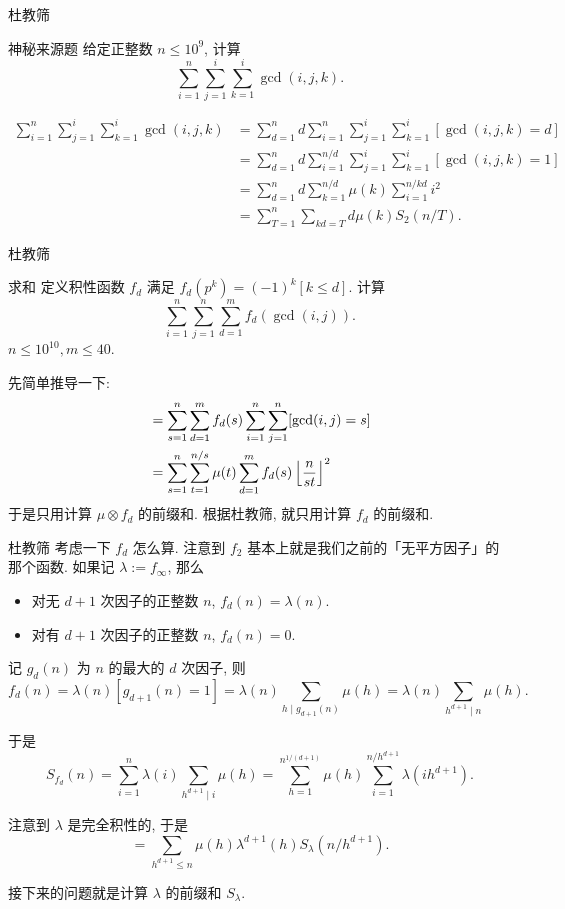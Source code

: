 \documentclass{beamer}
\begin{document}
    \begin{frame}{杜教筛}
        \begin{block}{神秘来源题}
            给定正整数 $n\leq 10^9$, 计算
            $$
            \sum_{i=1}^n\sum_{j=1}^i\sum_{k=1}^i\gcd(i,j,k).
            $$
        \end{block}
        \pause
        \begin{align*}
            \sum_{i=1}^n\sum_{j=1}^i\sum_{k=1}^i\gcd(i,j,k)&=\sum_{d=1}^n d\sum_{i=1}^n\sum_{j=1}^i\sum_{k=1}^i[\gcd(i,j,k)=d]\\
            &=\sum_{d=1}^nd\sum_{i=1}^{n/d}\sum_{j=1}^i\sum_{k=1}^i[\gcd(i,j,k)=1]\\
            &=\sum_{d=1}^nd\sum_{k=1}^{n/d}\mu(k)\sum_{i=1}^{n/kd}i^2\\
            &=\sum_{T=1}^n\sum_{kd=T}d\mu(k)S_2(n/T).
        \end{align*}
    \end{frame}

    \begin{frame}{杜教筛}
        \begin{block}{求和}
            定义积性函数 $f_d$ 满足 $f_d(p^k)=(-1)^k[k\leq d]$. 计算
            $$
            \sum_{i=1}^n\sum_{j=1}^n\sum_{d=1}^m f_d(\gcd(i,j)).
            $$
            $n\leq 10^{10},m\leq 40$.
        \end{block}
        \pause
        先简单推导一下:
        \begin{align*}
        &=\sum_{s=1}^n\sum_{d=1}^mf_d(s)\sum_{i=1}^n\sum_{j=1}^n[\gcd(i,j)=s]\\
        &=\sum_{s=1}^n\sum_{t=1}^{n/s}\mu(t)\sum_{d=1}^mf_d(s)\left\lfloor n\over st\right\rfloor^2
        \end{align*}
        于是只用计算 $\mu\otimes f_d$ 的前缀和. 根据杜教筛, 就只用计算 $f_d$ 的前缀和.
    \end{frame}

    \begin{frame}{杜教筛}
        考虑一下 $f_d$ 怎么算. 注意到 $f_2$ 基本上就是我们之前的「无平方因子」的那个函数. 如果记 $\lambda:=f_{\infty}$, 那么
        \begin{itemize}
            \item 对无 $d+1$ 次因子的正整数 $n$, $f_d(n)=\lambda(n)$.
            \item 对有 $d+1$ 次因子的正整数 $n$, $f_d(n)=0$.
        \end{itemize}
        记 $g_d(n)$ 为 $n$ 的最大的 $d$ 次因子, 则
        $$
        f_d(n)=\lambda(n)[g_{d+1}(n)=1]=\lambda(n)\sum_{h\mid g_{d+1}(n)}\mu(h)=\lambda(n)\sum_{h^{d+1}\mid n}\mu(h).
        $$

        于是
        $$
        S_{f_d}(n)=\sum_{i=1}^n\lambda(i)\sum_{h^{d+1}\mid i}\mu(h)=\sum_{h=1}^{n^{1/(d+1)}}\mu(h)\sum_{i=1}^{n/h^{d+1}}\lambda(ih^{d+1}).
        $$

        注意到 $\lambda$ 是完全积性的, 于是
        $$
        =\sum_{h^{d+1}\leq n}\mu(h)\lambda^{d+1}(h)S_\lambda(n/h^{d+1}).
        $$

        接下来的问题就是计算 $\lambda$ 的前缀和 $S_\lambda$.
    \end{frame}
\end{document}
